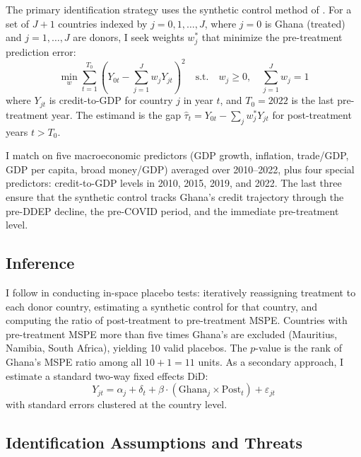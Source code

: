 \documentclass[12pt]{article}
\begin{document}
The primary identification strategy uses the synthetic control method of \citet{abadie2010synthetic, abadie2015comparative}. For a set of $J+1$ countries indexed by $j = 0, 1, \ldots, J$, where $j = 0$ is Ghana (treated) and $j = 1, \ldots, J$ are donors, I seek weights $w_j^*$ that minimize the pre-treatment prediction error:
\begin{equation}
    \min_{w} \sum_{t=1}^{T_0} \left( Y_{0t} - \sum_{j=1}^{J} w_j Y_{jt} \right)^2 \quad \text{s.t.} \quad w_j \geq 0, \quad \sum_{j=1}^{J} w_j = 1
\end{equation}
where $Y_{jt}$ is credit-to-GDP for country $j$ in year $t$, and $T_0 = 2022$ is the last pre-treatment year. The estimand is the gap $\hat{\tau}_t = Y_{0t} - \sum_j w_j^* Y_{jt}$ for post-treatment years $t > T_0$.

I match on five macroeconomic predictors (GDP growth, inflation, trade/GDP, GDP per capita, broad money/GDP) averaged over 2010--2022, plus four special predictors: credit-to-GDP levels in 2010, 2015, 2019, and 2022. The last three ensure that the synthetic control tracks Ghana's credit trajectory through the pre-DDEP decline, the pre-COVID period, and the immediate pre-treatment level.

\subsection{Inference}

I follow \citet{abadie2010synthetic} in conducting in-space placebo tests: iteratively reassigning treatment to each donor country, estimating a synthetic control for that country, and computing the ratio of post-treatment to pre-treatment MSPE. Countries with pre-treatment MSPE more than five times Ghana's are excluded (Mauritius, Namibia, South Africa), yielding 10 valid placebos. The $p$-value is the rank of Ghana's MSPE ratio among all $10 + 1 = 11$ units. As a secondary approach, I estimate a standard two-way fixed effects DiD:
\begin{equation}
    Y_{jt} = \alpha_j + \delta_t + \beta \cdot (\text{Ghana}_j \times \text{Post}_t) + \varepsilon_{jt}
\end{equation}
with standard errors clustered at the country level.

\subsection{Identification Assumptions and Threats}
\end{document}

